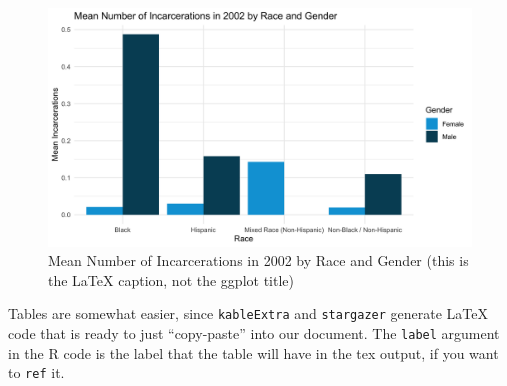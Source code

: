\documentclass{article}
\begin{document}
\begin{figure}[H]
    \begin{center}
        \includegraphics[width=.85\textwidth]{incarcerations_by_racegender}
    \end{center}
    \caption{Mean Number of Incarcerations in 2002 by Race and Gender (this is the LaTeX caption, not the ggplot title)}
    \label{fig:graph}
\end{figure}


Tables are somewhat easier, since \texttt{kableExtra} and \texttt{stargazer} generate LaTeX code that is ready to just ``copy-paste'' into our document. The \texttt{label} argument in the R code is the label that the table will have in the tex output, if you want to \texttt{ref} it.




\end{document}
